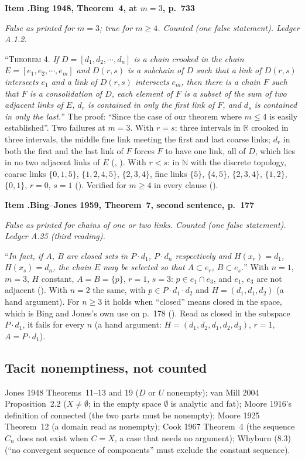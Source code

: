 \documentclass[11pt]{article}
\newcounter{defect}
\newenvironment{defect}[4]{%
  \par\addvspace{10pt}\refstepcounter{defect}%
  \noindent\textbf{Item \thedefect.\enspace #1}\par\nopagebreak
  \noindent\textit{#2}\par\nopagebreak\smallskip}{\par\addvspace{6pt}}
\begin{document}
\begin{defect}{Bing 1948, Theorem~4, at $m=3$, p.~733}{False as printed for $m=3$; true for $m\ge4$.
Counted (one false statement). Ledger A.1.2.}{1}{0}\label{it:b48-4}
``\textsc{Theorem 4.} \emph{If $D=[d_1,d_2,\cdots,d_n]$ is a chain crooked in the chain
$E=[e_1,e_2,\cdots,e_m]$ and $D(r,s)$ is a subchain of $D$ such that a link of $D(r,s)$ intersects
$e_1$ and a link of $D(r,s)$ intersects $e_m$, then there is a chain $F$ such that $F$ is a
consolidation of $D$, each element of $F$ is a subset of the sum of two adjacent links of $E$,
$d_r$ is contained in only the first link of $F$, and $d_s$ is contained in only the last.}'' The
proof: ``Since the case of our theorem where $m\le4$ is easily established''. Two failures at
$m=3$. With $r=s$: three intervals in $\mathbb R$ crooked in three intervals, the middle fine link
meeting the first and last coarse links; $d_r$ in both the first and the last link of $F$ forces
$F$ to have one link, all of $D$, which lies in no two adjacent links of $E$
(, ). With $r<s$: in $\mathbb N$
with the discrete topology, coarse links $\{0,1,5\}$, $\{1,2,4,5\}$, $\{2,3,4\}$, fine links
$\{5\}$, $\{4,5\}$, $\{2,3,4\}$, $\{1,2\}$, $\{0,1\}$, $r=0$, $s=1$
(). Verified for $m\ge4$ in every clause ().
\end{defect}

\begin{defect}{Bing--Jones 1959, Theorem~7, second sentence, p.~177}{False as printed for chains of
one or two links. Counted (one false statement). Ledger A.25 (third reading).}{1}{0}\label{it:bj7b}
``\emph{In fact, if $A$, $B$ are closed sets in $P\cdot d_1$, $P\cdot d_n$ respectively and
$H(x_r)=d_1$, $H(x_s)=d_n$, the chain $E$ may be selected so that $A\subset e_r$, $B\subset
e_s$.}'' With $n=1$, $m=3$, $H$ constant, $A=B=\{p\}$, $r=1$, $s=3$: $p\in e_1\cap e_3$, and $e_1$,
$e_3$ are not adjacent (). With $n=2$ the same, with $p\in
P\cdot d_1\cdot d_2$ and $H=(d_1,d_1,d_2)$ (a hand argument). For $n\ge3$ it holds when ``closed''
means closed in the space, which is Bing and Jones's own use on p.~178 ().
Read as closed in the subspace $P\cdot d_1$, it fails for every $n$ (a hand argument:
$H=(d_1,d_2,d_1,d_2,d_3)$, $r=1$, $A=P\cdot d_1$).
\end{defect}

\subsection*{Tacit nonemptiness, not counted}
Jones 1948 Theorems~11--13 and 19 ($D$ or $U$ nonempty); van Mill 2004 Proposition~2.2 ($X\ne
\emptyset$; in the empty space $\emptyset$ is analytic and fat); Moore 1916's definition of
connected (the two parts must be nonempty); Moore 1925 Theorem~12 (a domain read as nonempty);
Cook 1967 Theorem~4 (the sequence $C_n$ does not exist when $C=X$, a case that needs no argument);
Whyburn (8.3) (``no convergent sequence of components'' must exclude the constant sequence).
\end{document}
